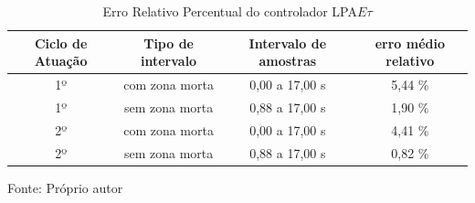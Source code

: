 \begin{table}[h]%
\centering
\caption{Erro Relativo Percentual do controlador LPA$E\tau$}
\label{tab:ErroLPAEt}

\begin{tabular}{c|c|c|c}
\hline
Ciclo de Atuação & Tipo de intervalo & Intervalo de amostras  &  erro médio relativo \\ \hline
\hline
1º & com zona morta & 0,00 a 17,00 s &  5,44 \% \\ \hline
1º & sem zona morta & 0,88 a 17,00 s &  1,90 \% \\ \hline
2º & com zona morta & 0,00 a 17,00 s &  4,41 \% \\ \hline
2º & sem zona morta & 0,88 a 17,00 s &  0,82 \% \\ \hline
\end{tabular}

{\vspace{0.2cm} \small Fonte: Próprio autor}
\end{table}




